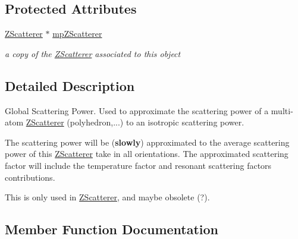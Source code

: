 \subsection*{Protected Attributes}
\begin{DoxyCompactItemize}
\item 
\mbox{\label{class_obj_cryst_1_1_global_scattering_power_aadee43da66fb5faaa1ed6296a0a90132}} 
\mbox{\hyperlink{class_obj_cryst_1_1_z_scatterer}{Z\+Scatterer}} $\ast$ \mbox{\hyperlink{class_obj_cryst_1_1_global_scattering_power_aadee43da66fb5faaa1ed6296a0a90132}{mp\+Z\+Scatterer}}
\begin{DoxyCompactList}\small\item\em a copy of the \mbox{\hyperlink{class_obj_cryst_1_1_z_scatterer}{Z\+Scatterer}} associated to this object \end{DoxyCompactList}\end{DoxyCompactItemize}


\subsection{Detailed Description}
Global Scattering Power. Used to approximate the scattering power of a multi-\/atom \mbox{\hyperlink{class_obj_cryst_1_1_z_scatterer}{Z\+Scatterer}} (polyhedron,...) to an isotropic scattering power. 

The scattering power will be ({\bfseries{slowly}}) approximated to the average scattering power of this \mbox{\hyperlink{class_obj_cryst_1_1_z_scatterer}{Z\+Scatterer}} take in all orientations. The approximated scattering factor will include the temperature factor and resonant scattering factors contributions.

This is only used in \mbox{\hyperlink{class_obj_cryst_1_1_z_scatterer}{Z\+Scatterer}}, and maybe obsolete (?). 

\subsection{Member Function Documentation}
\mbox{\label{class_obj_cryst_1_1_global_scattering_power_a76cf0e6d0bb30b0f7036cb6b65b45410}} 
